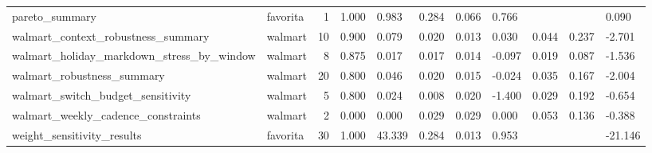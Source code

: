 \begin{table}
{\begin{tabular}{llrllllllll}
                              pareto\_summary &     favorita &                       1 &                                    1.000 &                        0.983 &                                      0.284 &                                       0.066 &                  0.766 &                  &                       &                      0.090 \\
          walmart\_context\_robustness\_summary &      walmart &                      10 &                                    0.900 &                        0.079 &                                      0.020 &                                       0.013 &                  0.030 &            0.044 &                 0.237 &                     -2.701 \\
   walmart\_holiday\_markdown\_stress\_by\_window &      walmart &                       8 &                                    0.875 &                        0.017 &                                      0.017 &                                       0.014 &                 -0.097 &            0.019 &                 0.087 &                     -1.536 \\
                  walmart\_robustness\_summary &      walmart &                      20 &                                    0.800 &                        0.046 &                                      0.020 &                                       0.015 &                 -0.024 &            0.035 &                 0.167 &                     -2.004 \\
           walmart\_switch\_budget\_sensitivity &      walmart &                       5 &                                    0.800 &                        0.024 &                                      0.008 &                                       0.020 &                 -1.400 &            0.029 &                 0.192 &                     -0.654 \\
          walmart\_weekly\_cadence\_constraints &      walmart &                       2 &                                    0.000 &                        0.000 &                                      0.029 &                                       0.029 &                  0.000 &            0.053 &                 0.136 &                     -0.388 \\
                  weight\_sensitivity\_results &     favorita &                      30 &                                    1.000 &                       43.339 &                                      0.284 &                                       0.013 &                  0.953 &                  &                       &                    -21.146 \\
\bottomrule
\end{tabular}
}

\end{table}
